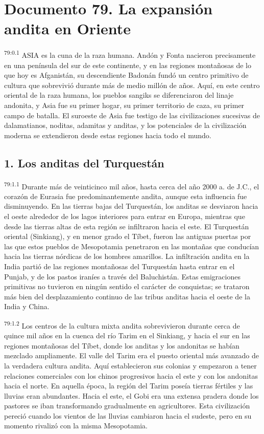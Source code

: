 \chapter{Documento 79. La expansión andita en Oriente}
\par
\textsuperscript{79:0.1} ASIA es la cuna de la raza humana. Andón y Fonta nacieron precisamente en una península del sur de este continente, y en las regiones montañosas de lo que hoy es Afganistán, su descendiente Badonán fundó un centro primitivo de cultura que sobrevivió durante más de medio millón de años. Aquí, en este centro oriental de la raza humana, los pueblos sangiks se diferenciaron del linaje andonita, y Asia fue su primer hogar, su primer territorio de caza, su primer campo de batalla. El suroeste de Asia fue testigo de las civilizaciones sucesivas de dalamatianos, noditas, adamitas y anditas, y los potenciales de la civilización moderna se extendieron desde estas regiones hacia todo el mundo.

\section*{1. Los anditas del Turquestán}
\par
\textsuperscript{79:1.1} Durante más de veinticinco mil años, hasta cerca del año
2000 a. de J.C., el corazón de Eurasia fue predominantemente andita, aunque esta influencia fue disminuyendo. En las tierras bajas del Turquestán, los anditas se desviaron hacia el oeste alrededor de los lagos interiores para entrar en Europa, mientras que desde las tierras altas de esta región se infiltraron hacia el este. El Turquestán oriental
(Sinkiang), y en menor grado el Tíbet, fueron las antiguas puertas por las que estos pueblos de Mesopotamia penetraron en las montañas que conducían hacia las tierras nórdicas de los hombres amarillos. La infiltración andita en la India partió de las regiones montañosas del Turquestán hasta entrar en el Punjab, y de los pastos iraníes a través del Baluchistán. Estas emigraciones primitivas no tuvieron en ningún sentido el carácter de conquistas; se trataron más bien del desplazamiento continuo de las tribus anditas hacia el oeste de la India y China.

\par
\textsuperscript{79:1.2} Los centros de la cultura mixta andita sobrevivieron durante cerca de quince mil años en la cuenca del río Tarim en el Sinkiang, y hacia el sur en las regiones montañosas del Tíbet, donde los anditas y los andonitas se habían mezclado ampliamente. El valle del Tarim era el puesto oriental más avanzado de la verdadera cultura andita. Aquí establecieron sus colonias y empezaron a tener relaciones comerciales con los chinos progresivos hacia el este y con los andonitas hacia el norte. En aquella época, la región del Tarim poseía tierras fértiles y las lluvias eran abundantes. Hacia el este, el Gobi era una extensa pradera donde los pastores se iban transformando gradualmente en agricultores. Esta civilización pereció cuando los vientos de las lluvias cambiaron hacia el sudeste, pero en su momento rivalizó con la misma Mesopotamia.

